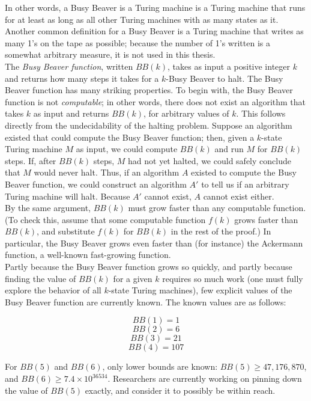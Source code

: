 \documentclass[11pt]{report}
\begin{document}

In other words, a Busy Beaver is a Turing machine is a Turing machine that runs for at least as long as all other Turing machines with as many states as it. Another common definition for a Busy Beaver is a Turing machine that writes as many 1's on the tape as possible; because the number of 1's written is a somewhat arbitrary measure, it is not used in this thesis. \\

The \emph{Busy Beaver function}, written $BB(k)$, takes as input a positive integer $k$ and returns how many steps it takes for a $k$-Busy Beaver to halt. The Busy Beaver function has many striking properties. To begin with, the Busy Beaver function is not \emph{computable}; in other words, there does not exist an algorithm that takes $k$ as input and returns $BB(k)$, for arbitrary values of $k$. This follows directly from the undecidability of the halting problem. Suppose an algorithm existed that could compute the Busy Beaver function; then, given a $k$-state Turing machine $M$ as input, we could compute $BB(k)$ and run $M$ for $BB(k)$ steps. If, after $BB(k)$ steps, $M$ had not yet halted, we could safely conclude that $M$ would never halt. Thus, if an algorithm $A$ existed to compute the Busy Beaver function, we could construct an algorithm $A'$ to tell us if an arbitrary Turing machine will halt. Because $A'$ cannot exist, $A$ cannot exist either. \\

By the same argument, $BB(k)$ must grow faster than any computable function. (To check this, assume that some computable function $f(k)$ grows faster than $BB(k)$, and substitute $f(k)$ for $BB(k)$ in the rest of the proof.) In particular, the Busy Beaver grows even faster than (for instance) the Ackermann function, a well-known fast-growing function. \\

Partly because the Busy Beaver function grows so quickly, and partly because finding the value of $BB(k)$ for a given $k$ requires so much work (one must fully explore the behavior of all $k$-state Turing machines), few explicit values of the Busy Beaver function are currently known. The known values are as follows: 

$$BB(1) = 1$$
$$BB(2) = 6$$
$$BB(3) = 21$$
$$BB(4) = 107$$

For $BB(5)$ and $BB(6)$, only lower bounds are known: $BB(5) \ge 47,176,870$, and $BB(6) \ge 7.4 \times 10^{36534}$. Researchers are currently working on pinning down the value of $BB(5)$ exactly, and consider it to possibly be within reach. \\
\end{document}
